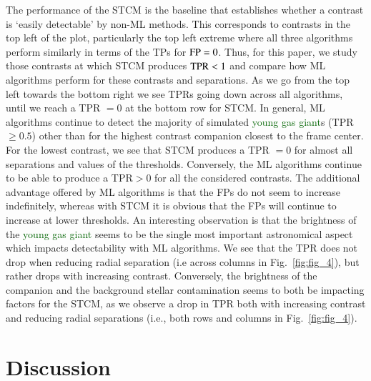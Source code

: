 \documentclass{aa}
\newcommand{\newchange}[1]{\textcolor{darkgreen}{#1}}
\begin{document}
The performance of the STCM is the baseline that establishes whether a contrast is `easily detectable' by non-ML methods. 
This corresponds to contrasts in the top left of the plot, particularly the top left extreme where all three algorithms perform similarly in terms of the TPs for ${\rm FP}=0$.
Thus, for this paper, we study those contrasts at which STCM produces ${\rm TPR}<1$ and compare how ML algorithms perform for these contrasts and separations.
As we go from the top left towards the bottom right we see TPRs going down across all algorithms, until we reach a TPR $=0$ at the bottom row for STCM. 
In general, ML algorithms continue to detect the majority of simulated \newchange{young gas giant}s (TPR $\ge 0.5$) other than for the highest contrast companion closest to the frame center.
For the lowest contrast, we see that STCM produces a TPR $=0$ for almost all separations and values of the thresholds.
Conversely, the ML algorithms continue to be able to produce a TPR$>0$ for all the considered contrasts.
The additional advantage offered by ML algorithms is that the FPs do not seem to increase indefinitely, whereas with STCM it is obvious that the FPs will continue to increase at lower thresholds.
An interesting observation is that the brightness of the \newchange{young gas giant} seems to be the single most important astronomical aspect which impacts detectability with ML algorithms.
We see that the TPR does not drop when reducing radial separation (i.e across columns in Fig.~\ref{fig:fig_4}), but rather drops with increasing contrast. 
Conversely,  the brightness of the companion and the background stellar contamination seems to both be impacting factors for the STCM, as we observe a drop in TPR both with increasing contrast and reducing radial separations (i.e., both rows and columns in Fig.~\ref{fig:fig_4}).




\section{Discussion}
\label{sec:discussion}
\end{document}
